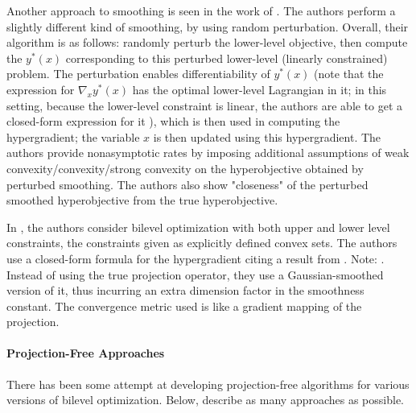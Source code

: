   Another approach to smoothing is seen in the work of \cite{khanduri2023linearly}. The authors perform a slightly different kind of smoothing, by using random perturbation. Overall, their algorithm is as follows: randomly perturb the lower-level objective, then compute the $y^\ast(x)$ corresponding to this perturbed lower-level (linearly constrained) problem. The perturbation enables differentiability of $y^\ast(x)$ (note that the expression for $\nabla_x y^\ast(x)$ has the optimal lower-level Lagrangian in it; in this setting, because the lower-level constraint is linear, the authors are able to get a closed-form expression for it ), which is then used in computing the hypergradient; the variable $x$ is then updated using this hypergradient. The authors provide nonasymptotic rates by imposing additional assumptions of weak convexity/convexity/strong convexity on the hyperobjective obtained by perturbed smoothing. The authors also show "closeness" of the perturbed smoothed hyperobjective from the true hyperobjective.  

  In \cite{DMLCBO}, the authors consider bilevel optimization with both upper and lower level constraints, the constraints given as explicitly defined convex sets. The authors use a closed-form formula for the hypergradient citing a result from \cite{blondel2022efficient}. Note: . Instead of using the true projection operator, they use a Gaussian-smoothed version of it, thus incurring an extra dimension factor in the smoothness constant. The convergence metric used is like a gradient mapping of the projection.    
 
\paragraph{Projection-Free Approaches}
There has been some attempt at developing projection-free algorithms for various versions of bilevel optimization. Below, describe as many approaches as possible. 

